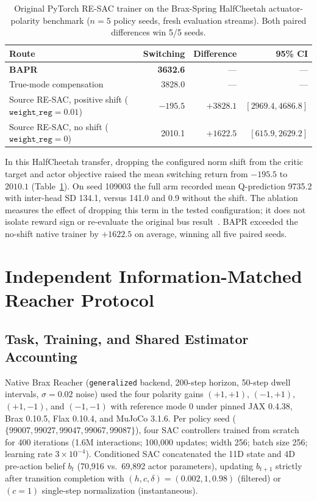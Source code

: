 \begin{table}[ht]
\centering
\small
\caption{Original PyTorch RE-SAC trainer on the Brax-Spring HalfCheetah actuator-polarity benchmark ($n=5$ policy seeds, fresh evaluation streams). Both paired differences win 5/5 seeds.}
\label{tab:source_trainer_comparison}
\begin{tabular}{lrrr}
\toprule
Route & Switching & Difference & 95\% CI \\
\midrule
\textbf{BAPR} & \textbf{3632.6} & --- & --- \\
True-mode compensation & 3828.0 & --- & --- \\
Source RE-SAC, positive shift ($\texttt{weight\_reg}=0.01$) & $-195.5$ & $+3828.1$ & $[2969.4,4686.8]$ \\
Source RE-SAC, no shift ($\texttt{weight\_reg}=0$) & 2010.1 & $+1622.5$ & $[615.9,2629.2]$ \\
\bottomrule
\end{tabular}
\end{table}

In this HalfCheetah transfer, dropping the configured norm shift from the critic target and actor objective raised the mean switching return from $-195.5$ to $2010.1$ (Table~\ref{tab:source_trainer_comparison}). On seed 109003 the full arm recorded mean Q-prediction 9735.2 with inter-head SD 134.1, versus 141.0 and 0.9 without the shift. The ablation measures the effect of dropping this term in the tested configuration; it does not isolate reward sign or re-evaluate the original bus result~\citep{Zhang2026RESAC}. BAPR exceeded the no-shift native trainer by $+1622.5$ on average, winning all five paired seeds.

\section{Independent Information-Matched Reacher Protocol}
\label{app:reacher_protocol}

\subsection{Task, Training, and Shared Estimator Accounting}

Native Brax Reacher (\texttt{generalized} backend, 200-step horizon, 50-step dwell intervals, $\sigma=0.02$ noise) used the four polarity gains $(+1,+1)$, $(-1,+1)$, $(+1,-1)$, and $(-1,-1)$ with reference mode 0 under pinned JAX 0.4.38, Brax 0.10.5, Flax 0.10.4, and MuJoCo 3.1.6. Per policy seed ($\{99007,99027,99047,99067,99087\}$), four SAC controllers trained from scratch for 400 iterations (1.6M interactions; 100,000 updates; width 256; batch size 256; learning rate $3\times 10^{-4}$). Conditioned SAC concatenated the 11D state and 4D pre-action belief $b_t$ (70,916 vs.\ 69,892 actor parameters), updating $b_{t+1}$ strictly after transition completion with $(h,c,\delta)=(0.002,1,0.98)$ (filtered) or $(c=1)$ single-step normalization (instantaneous).


